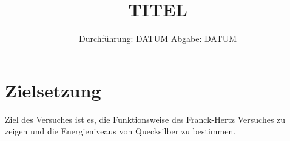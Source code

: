 

\subject{V601}
\title{TITEL}
\date{%
  Durchführung: DATUM
  \hspace{3em}
  Abgabe: DATUM
}



\maketitle
\thispagestyle{empty}
\tableofcontents
\newpage

\section{Zielsetzung}
Ziel des Versuches ist es, die Funktionsweise des Franck-Hertz Versuches zu zeigen und 
die Energieniveaus von Quecksilber zu bestimmen.






\printbibliography{}


